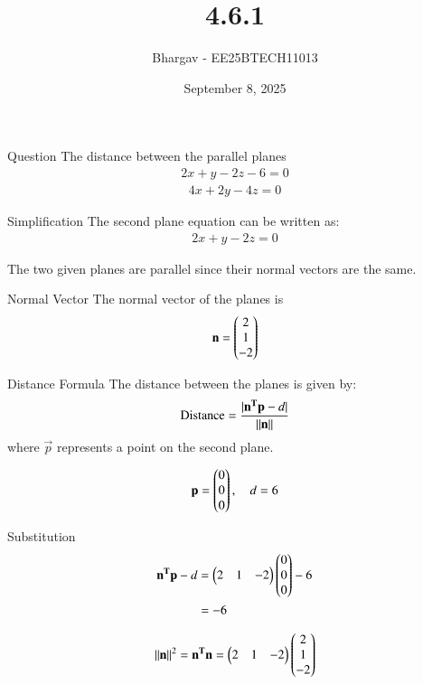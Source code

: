 \documentclass{beamer}
\title{4.6.1}
\date{September 8, 2025}
\author{Bhargav - EE25BTECH11013}
\begin{document}
\frame{\titlepage}

\begin{frame}{Question}
The distance between the parallel planes
\begin{align}
2x + y - 2z - 6 = 0
\end{align}
\begin{align}
4x + 2y - 4z = 0
\end{align}
\end{frame}

\begin{frame}{Simplification}
The second plane equation can be written as:
\begin{align}
2x + y - 2z = 0
\end{align}

The two given planes are parallel since their normal vectors are the same.
\end{frame}

\begin{frame}{Normal Vector}
The normal vector of the planes is
\begin{align}
\mathbf{n} = \begin{pmatrix}2 \\ 1 \\ -2\end{pmatrix}
\end{align}
\end{frame}

\begin{frame}{Distance Formula}
The distance between the planes is given by:
\begin{align}
\text{Distance} = \frac{|\mathbf{n^T}\mathbf{p} - d|}{\left\lVert\mathbf{n}\right\rVert}
\end{align}
where $\vec{p}$ represents a point on the second plane.

\begin{align}
\mathbf{p} = \begin{pmatrix}0 \\ 0 \\ 0\end{pmatrix}, \quad d=6
\end{align}
\end{frame}

\begin{frame}{Substitution}
\begin{align}
\mathbf{n^T}\mathbf{p} - d &= \begin{pmatrix}2 & 1 & -2\end{pmatrix}\begin{pmatrix}0 \\ 0 \\ 0\end{pmatrix} - 6 \\
&= -6
\end{align}

\begin{align}
\left\lVert\mathbf{n}\right\rVert^2 = \mathbf{n^T}\mathbf{n} = \begin{pmatrix}2 & 1 & -2\end{pmatrix}\begin{pmatrix}2 \\ 1 \\ -2\end{pmatrix}
\end{align}
\end{frame}
\end{document}
